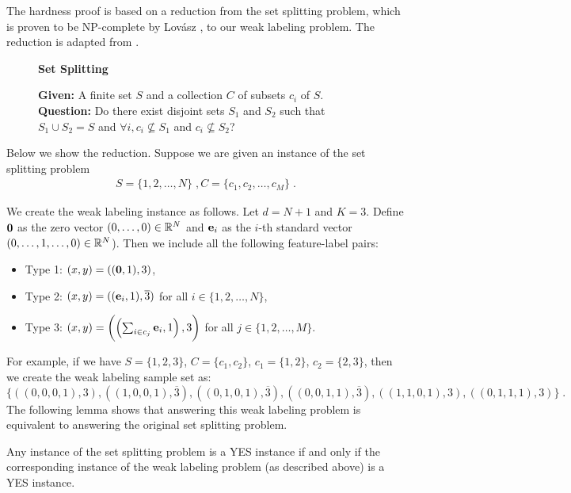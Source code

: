The hardness proof is based on a reduction from the set splitting problem, which
is proven to be NP-complete by Lov\'asz \cite{Garey-Johnson-1979}, to our weak
labeling problem. The reduction is adapted from \cite{Blum-Rivest-1993}.
\begin{figure}[H]
\begin{framed}
\begin{center}
    \textbf{Set Splitting}
\end{center}
\textbf{Given:} A finite set $S$ and a collection $C$ of subsets $c_i$ of $S$. \\
\textbf{Question:} Do there exist disjoint sets $S_1$ and $S_2$ such that $S_1 \cup S_2 = S$ and $\forall i, c_i\not\subseteq S_1$ and $c_i\not\subseteq S_2$?
\end{framed}
\end{figure}

Below we show the reduction. Suppose we are given an instance of the set
splitting problem
\begin{align*}
S = \{1, 2, \dots, N\} \; ,
C = \{c_1, c_2, \dots, c_M\} \; .
\end{align*}

We create the weak labeling instance as follows. Let $d=N+1$ and $K=3$.
Define $\mathbf{0}$ as the zero vector $(0,\dots,0)\in \mathbb{R}^N$ and $\mathbf{e}_i$ as the
$i$-th standard vector $(0,\dots, 1, \dots, 0)\in \mathbb{R}^N$). Then we include all
the following feature-label pairs:
\begin{itemize}
\item Type 1: $(x,y)=((\mathbf{0},1), 3)$,
\item Type 2: $(x,y)=((\mathbf{e}_i,1), \overline{3})$ for all $i \in \{1,2,\dots,N\}$,
\item Type 3: $(x,y)=\left(\left(\sum_{i\in c_j} \mathbf{e}_i, 1\right), 3\right)$ for all $j \in \{1,2,\dots,M\}$.
\end{itemize}

For example, if we have $S=\{1,2,3\}$, $C=\{c_1, c_2\}$, $c_1 = \{1,2\}$,
$c_2=\{2,3\}$, then we create the weak labeling sample set as:
\[
\{
((0,0,0,1),3), ((1,0,0,1),\overline{3}), ((0,1,0,1),\overline{3}),
((0,0,1,1),\overline{3}), ((1,1,0,1),3), ((0,1,1,1),3)
\} \; .
\]
The following lemma shows that answering this weak labeling problem is
equivalent to answering the original set splitting problem.

\begin{lemma}
Any instance of the set splitting problem is a YES instance if and only if the
corresponding instance of the weak labeling problem (as described above) is a
YES instance.
\end{lemma}

